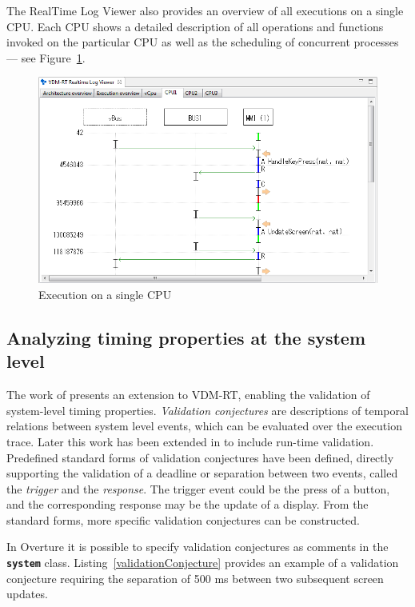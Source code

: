 \documentclass{overturerepchap}
\begin{document}
The RealTime Log Viewer also provides an overview of all executions on a single CPU.
Each CPU shows a detailed description of all operations and functions invoked
on the particular CPU as well as the scheduling of concurrent processes --- see
Figure~\ref{fig:userguide:ExecutionCPU}.

\begin{figure}[htp]
\begin{center}
  \includegraphics[width=5in]{figures/ExecutionCPU}
  \caption{Execution on a single CPU}
  \label{fig:userguide:ExecutionCPU}
\end{center}
\end{figure}

\subsection*{Analyzing timing properties at the system level}

The work of\cite{Fitzgerald&07b} presents an extension to VDM-RT, enabling the validation of system-level timing properties. \textit{Validation conjectures} are descriptions of temporal relations between system level events, which can be evaluated over the execution trace. Later this work has been extended in\cite{Ribeiro&11} to include run-time validation. Predefined standard forms of validation conjectures have been defined, directly supporting the validation of a deadline or separation between two events, called the \textit{trigger} and the \textit{response}. The trigger event could be the press of a button, and the corresponding response may be the update of a display. From the standard forms, more specific validation conjectures can be constructed.

In Overture it is possible to specify validation conjectures as comments in the \textbf{\texttt{system}} class. Listing~\ref{validationConjecture} provides an example of a validation conjecture requiring the separation of 500 ms between two subsequent screen updates.
\end{document}
